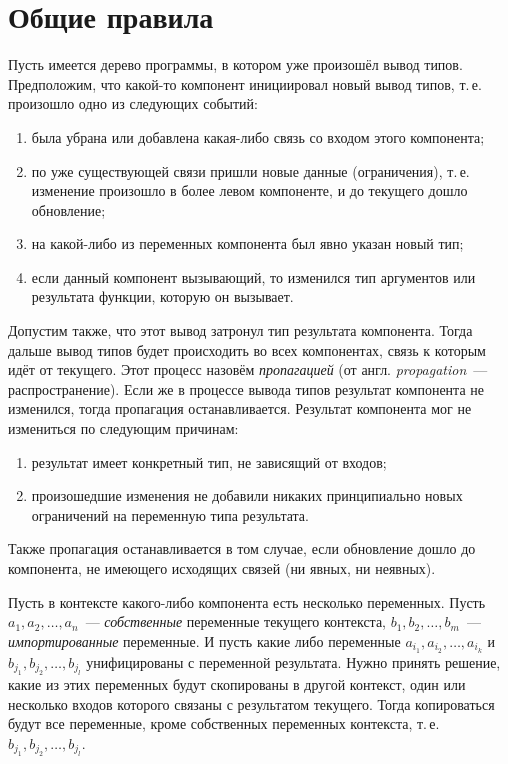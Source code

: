 \section{Общие правила}
Пусть имеется дерево программы, в котором уже произошёл вывод типов. Предположим, что какой-то компонент инициировал новый вывод типов, т.\,е. произошло одно из следующих событий:
\begin{enumerate}[1)]
	\item была убрана или добавлена какая-либо связь со входом этого компонента;
	\item по уже существующей связи пришли новые данные (ограничения), т.\,е. изменение произошло в более левом компоненте, и до текущего дошло обновление;
	\item на какой-либо из переменных компонента был явно указан новый тип;
	\item если данный компонент вызывающий, то изменился тип аргументов или результата функции, которую он вызывает.
\end{enumerate}
Допустим также, что этот вывод затронул тип результата компонента. Тогда дальше вывод типов будет происходить во всех компонентах, связь к которым идёт от текущего. Этот процесс назовём \textit{пропагацией} (от англ. \textit{propagation}~--- распространение). Если же в процессе вывода типов результат компонента не изменился, тогда пропагация останавливается. Результат компонента мог не измениться по следующим причинам:
\begin{enumerate}[1)]
	\item результат имеет конкретный тип, не зависящий от входов;
	\item произошедшие изменения не добавили никаких принципиально новых ограничений на переменную типа результата.
\end{enumerate}
Также пропагация останавливается в том случае, если обновление дошло до компонента, не имеющего исходящих связей (ни явных, ни неявных).

Пусть в контексте какого-либо компонента есть несколько переменных. Пусть $a_1, a_2, \ldots, a_n$~--- \textit{собственные} переменные текущего контекста, $b_1, b_2, \ldots, b_m$~--- \textit{импортированные} переменные. И пусть какие либо переменные $a_{i_1}, a_{i_2}, \ldots, a_{i_k}$ и $b_{j_1}, b_{j_2}, \ldots, b_{j_l}$ унифицированы с переменной результата. Нужно принять решение, какие из этих переменных будут скопированы в другой контекст, один или несколько входов которого связаны с результатом текущего. Тогда копироваться будут все переменные, кроме собственных переменных контекста, т.\,е. $b_{j_1}, b_{j_2}, \ldots, b_{j_l}$.

